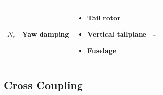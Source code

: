 \documentclass[
]{book}
\providecommand{\tightlist}{%
  \setlength{\itemsep}{0pt}\setlength{\parskip}{0pt}}
\begin{document}
\begin{longtable}[]{@{}cllc@{}}
\begin{minipage}[t]{0.18\columnwidth}\centering
\(N_r\)\strut
\end{minipage} & \begin{minipage}[t]{0.19\columnwidth}\raggedright
Yaw damping\strut
\end{minipage} & \begin{minipage}[t]{0.31\columnwidth}\raggedright
\begin{itemize}
\tightlist
\item
  Tail rotor
\item
  Vertical tailplane
\item
  Fuselage
\end{itemize}\strut
\end{minipage} & \begin{minipage}[t]{0.20\columnwidth}\centering
-\strut
\end{minipage}\tabularnewline
\bottomrule
\end{longtable}

\hypertarget{cross-coupling}{%
\subsection{Cross Coupling}\label{cross-coupling}}
\end{document}

